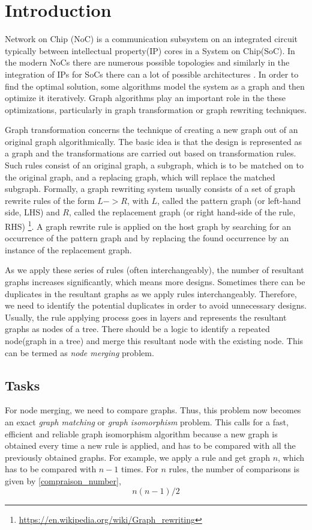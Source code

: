 \chapter{Introduction}\label{chapter:introduction}

Network on Chip (NoC) is a communication subsystem on an integrated circuit typically between intellectual property(IP) cores in a System on Chip(SoC). In the modern NoCs there are numerous possible topologies and similarly in the integration of IPs for SoCs there can a lot of possible architectures \cite{noc}.
In order to find the optimal solution, some algorithms model the system as a graph and then optimize it iteratively. Graph algorithms play an important role in the these optimizations, particularly in graph transformation or graph rewriting techniques.

Graph transformation concerns the technique of creating a new graph out of an original graph algorithmically. The basic idea is that the design is represented as a graph and the transformations are carried out based on transformation rules. Such rules consist of an original graph,
a subgraph, which is to be matched on to the original graph, and a replacing graph, which will replace the matched subgraph. 
Formally, a graph rewriting system usually consists of a set of graph rewrite rules of the form $L -> R$, with $L$, called the pattern graph (or left-hand side, LHS) and $R$, called the replacement graph (or right hand-side of the rule, RHS) \footnote{\url{https://en.wikipedia.org/wiki/Graph_rewriting}}. A graph rewrite rule is applied on the host graph by searching for an occurrence of the pattern graph and by replacing the found occurrence by an instance of the replacement graph.

As we apply these series of rules (often interchangeably), the number of resultant graphs increases significantly, which means more designs. Sometimes there can be duplicates in the resultant graphs as we apply rules interchangeably. Therefore, we need to identify the potential duplicates in order to avoid unnecessary designs. Usually, the rule applying process goes in layers and represents the resultant graphs as nodes of a tree. There should be a logic to identify a repeated node(graph in a tree) and merge this resultant node with the existing node. This can be termed as \textit{node merging} problem. 

\section{Tasks}
For node merging, we need to compare graphs. Thus, this problem now becomes an exact \textit{graph matching} or \textit{graph isomorphism} problem. This calls for a fast, efficient and reliable graph isomorphism algorithm because a new graph is obtained every time a new rule is applied, and has to be compared with all the previously obtained graphs. 
For example, we apply a rule and get graph $n$, which has to be compared with $n-1$ times. For $n$ rules, the number of comparisons is given by \ref{compraison_number}, 
\begin{equation}
            n(n-1)/2 
        \label{compraison_number}
\end{equation}

